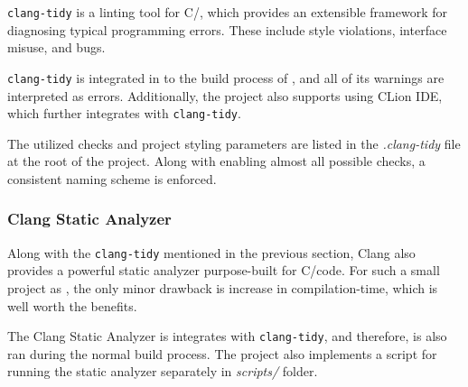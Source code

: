 \texttt{clang-tidy} is a linting tool for C/\CC, which provides an extensible
framework for diagnosing typical programming errors. These include style
violations, interface misuse, and bugs.

\texttt{clang-tidy} is integrated in to the build process of \pman,
and all of its warnings are interpreted as errors. Additionally, the project
also supports using CLion IDE, which further integrates with \texttt{clang-tidy}.

The utilized checks and project styling parameters are listed in the
\textit{.clang-tidy} file at the root of the project. Along with enabling
almost all possible checks, a consistent naming scheme is enforced.

\subsubsection{Clang Static Analyzer}

Along with the \texttt{clang-tidy} mentioned in the previous section, Clang
also provides a powerful static analyzer purpose-built for C/\CC code. For such
a small project as \pman, the only minor drawback is increase in
compilation-time, which is well worth the benefits.

The Clang Static Analyzer is integrates with \texttt{clang-tidy}, and therefore,
is also ran during the normal build process. The project also implements a
script for running the static analyzer separately in \textit{scripts/} folder.

